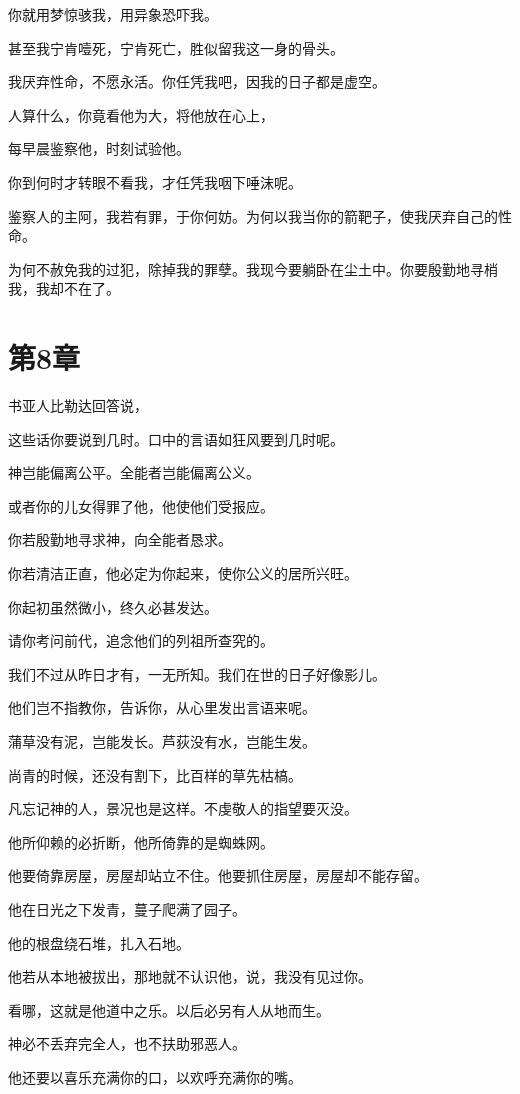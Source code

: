 \documentclass[12pt,oneside]{book}
\begin{document}
你就用梦惊骇我，用异象恐吓我。

甚至我宁肯噎死，宁肯死亡，胜似留我这一身的骨头。

我厌弃性命，不愿永活。你任凭我吧，因我的日子都是虚空。

人算什么，你竟看他为大，将他放在心上，

每早晨鉴察他，时刻试验他。

你到何时才转眼不看我，才任凭我咽下唾沫呢。

鉴察人的主阿，我若有罪，于你何妨。为何以我当你的箭靶子，使我厌弃自己的性命。

为何不赦免我的过犯，除掉我的罪孽。我现今要躺卧在尘土中。你要殷勤地寻梢我，我却不在了。


\chapter{第8章}
书亚人比勒达回答说，

这些话你要说到几时。口中的言语如狂风要到几时呢。

神岂能偏离公平。全能者岂能偏离公义。

或者你的儿女得罪了他，他使他们受报应。

你若殷勤地寻求神，向全能者恳求。

你若清洁正直，他必定为你起来，使你公义的居所兴旺。

你起初虽然微小，终久必甚发达。

请你考问前代，追念他们的列祖所查究的。

我们不过从昨日才有，一无所知。我们在世的日子好像影儿。

他们岂不指教你，告诉你，从心里发出言语来呢。

蒲草没有泥，岂能发长。芦荻没有水，岂能生发。

尚青的时候，还没有割下，比百样的草先枯槁。

凡忘记神的人，景况也是这样。不虔敬人的指望要灭没。

他所仰赖的必折断，他所倚靠的是蜘蛛网。

他要倚靠房屋，房屋却站立不住。他要抓住房屋，房屋却不能存留。

他在日光之下发青，蔓子爬满了园子。

他的根盘绕石堆，扎入石地。

他若从本地被拔出，那地就不认识他，说，我没有见过你。

看哪，这就是他道中之乐。以后必另有人从地而生。

神必不丢弃完全人，也不扶助邪恶人。

他还要以喜乐充满你的口，以欢呼充满你的嘴。
\end{document}
